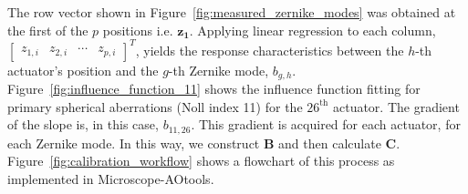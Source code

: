 The row vector shown in Figure~\ref{fig:measured_zernike_modes} was 
obtained at the first of the $p$ positions i.e. $\boldsymbol{z_{1}}$. 
Applying linear regression to each column, $\begin{bmatrix} z_{1,i} & z_{2,i} 
& \cdots & z_{p,i} \end{bmatrix}^T$, yields the response characteristics 
between the $h$-th actuator's position and the $g$-th Zernike mode, 
$b_{g,h}$. Figure~\ref{fig:influence_function_11} shows the influence 
function fitting for primary spherical aberrations (Noll index 11) for the 
$26^{\text{th}}$ actuator. The gradient of the slope is, in this case, 
$b_{11,26}$. This gradient is acquired for each actuator, for each Zernike 
mode. In this way, we construct $\boldsymbol{B}$ and then calculate 
$\boldsymbol{C}$. Figure~\ref{fig:calibration_workflow} shows a flowchart of 
this process as implemented in Microscope-AOtools.


